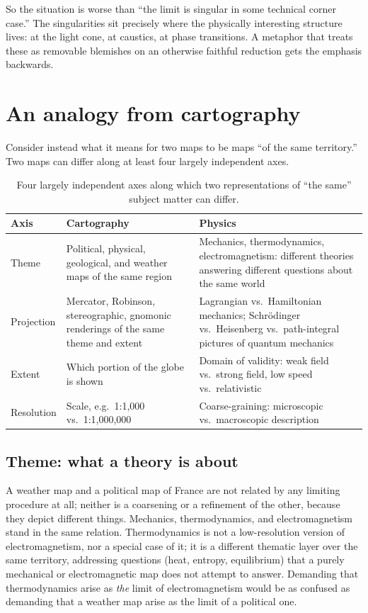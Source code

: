 So the situation is worse than ``the limit is singular in some technical corner case.'' The singularities sit precisely where the physically interesting structure lives: at the light cone, at caustics, at phase transitions. A metaphor that treats these as removable blemishes on an otherwise faithful reduction gets the emphasis backwards.

\section{An analogy from cartography}
\label{sec:cartography}

Consider instead what it means for two maps to be maps ``of the same territory.'' Two maps can differ along at least four largely independent axes.

\begin{table}[h]
\centering
\renewcommand{\arraystretch}{1.3}
\begin{tabular}{p{2.2cm} p{5.6cm} p{5.6cm}}
\hline
\textbf{Axis} & \textbf{Cartography} & \textbf{Physics} \\
\hline
Theme & Political, physical, geological, and weather maps of the same region & Mechanics, thermodynamics, electromagnetism: different theories answering different questions about the same world \\
Projection & Mercator, Robinson, stereographic, gnomonic renderings of the same theme and extent & Lagrangian vs.\ Hamiltonian mechanics; Schr\"odinger vs.\ Heisenberg vs.\ path-integral pictures of quantum mechanics \\
Extent & Which portion of the globe is shown & Domain of validity: weak field vs.\ strong field, low speed vs.\ relativistic \\
Resolution & Scale, e.g.\ 1:1{,}000 vs.\ 1:1{,}000{,}000 & Coarse-graining: microscopic vs.\ macroscopic description \\
\hline
\end{tabular}
\caption{Four largely independent axes along which two representations of ``the same'' subject matter can differ.}
\label{tab:axes}
\end{table}

\subsection{Theme: what a theory is about}

A weather map and a political map of France are not related by any limiting procedure at all; neither is a coarsening or a refinement of the other, because they depict different things. Mechanics, thermodynamics, and electromagnetism stand in the same relation. Thermodynamics is not a low-resolution version of electromagnetism, nor a special case of it; it is a different thematic layer over the same territory, addressing questions (heat, entropy, equilibrium) that a purely mechanical or electromagnetic map does not attempt to answer. Demanding that thermodynamics arise as \emph{the} limit of electromagnetism would be as confused as demanding that a weather map arise as the limit of a political one.

